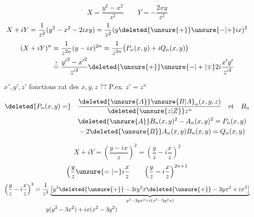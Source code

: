 \[
X=\frac{y^2-x^2}{z^2}\qquad Y=-\frac{2xy}{z^2}
\]
\[
X+iY=\frac1{z^2}(y^2-x^2-2ixy)=\frac1{z^2}(y\deleted{\unsure{+}}\unsure{-|+}ix)^2
\]
\[
\begin{aligned}
(X+iY)^n&=\frac1{z^{2n}}(y-ix)^{2n}=\frac1{z^{2n}}\bigl(P_n(x,y)+iQ_n(x,y)\bigr)\\
&\overset{?}{=}\frac{{y'}^2-{x'}^2}{{z'}^2}\deleted{\unsure{+}}\unsure{-|+|\mp}2i\frac{x'y'}{{z'}^2}
\end{aligned}
\]

$x',y',z'$ fonctions rat des $x,y,z$ ?? P.ex. $z'=z^n$

\[
\begin{aligned}
\deleted{P_n(x,y)=}\quad&\frac{\deleted{\unsure{A}}\unsure{B|A}_n(x,y,z)}{\deleted{\unsure{z|Z}}z^n}\quad\text{et}\quad B_n\\
&\deleted{\unsure{A}}B_n(x,y)^2-A_n(x,y)^2=P_n(x,y)\\
&-2\deleted{\unsure{B}}A_n(x,y)B_n(x,y)=Q_n(x,y)
\end{aligned}
\]

\[
X+iY=\left(\frac{y-ix}{z}\right)^2=\left(\frac yz-i\frac xz\right)^2
\]
\[
\Bigl(\frac yz\unsure{=|-}i\frac xz
\qquad \left(\frac yz-i\frac xz\right)^{2n+1}
\]
\[
\begin{aligned}
\left(\frac yz-i\frac xz\right)^3&=\frac1{z^3}
\underbrace{\bigl[y^3\deleted{\unsure{+}}-3iy^2x\deleted{\unsure{+}}-3yx^2+ix^3\bigr]}_{y^3-3yx^2+i(x^3-3y^2x)}\\
&\qquad y(y^2-3x^2)+ix(x^2-3y^2)
\end{aligned}
\]

